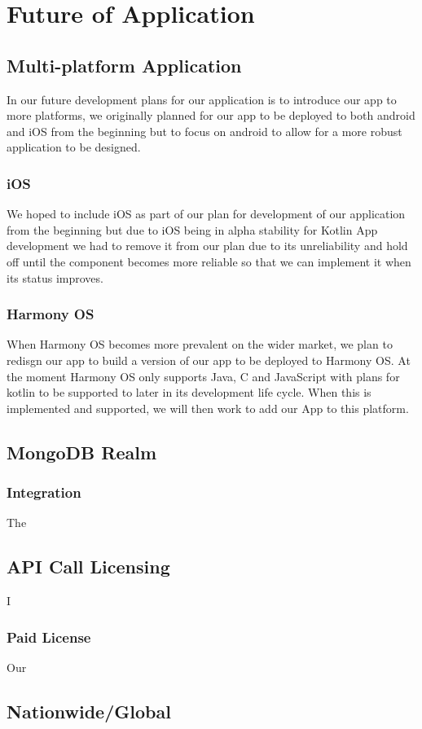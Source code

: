 \section{Future of Application}
\subsection{Multi-platform Application}
In our future development plans for our application is to introduce our app to more platforms, we originally planned for our app to be deployed to both android and iOS from the beginning but to focus on android to allow for a more robust application to be designed.
\subsubsection{iOS}
We hoped to include iOS as part of our plan for development of our application from the beginning but due to iOS being in alpha stability for Kotlin App development\cite{ref2} we had to remove it from our plan due to its unreliability and hold off until the component becomes more reliable so that we can implement it when its status improves.
\subsubsection{Harmony OS}
When Harmony OS becomes more prevalent on the wider market, we plan to redisgn our app to build a version of our app to be deployed to Harmony OS. At the moment Harmony OS only supports Java, C and JavaScript with plans for kotlin to be supported to later in its development life cycle. When this is implemented and supported, we will then work to add our App to this platform.
\subsection{MongoDB Realm}
\subsubsection{Integration}
The
\subsection{API Call Licensing}
I
\subsubsection{Paid License}
Our
\subsection{Nationwide/Global}
